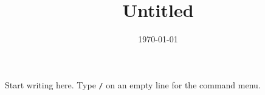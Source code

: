 \documentclass{article}
\title{Untitled}
\author{}
\date{\today}
\begin{document}
\maketitle

Start writing here. Type \texttt{/} on an empty line for the command menu.
\end{document}
